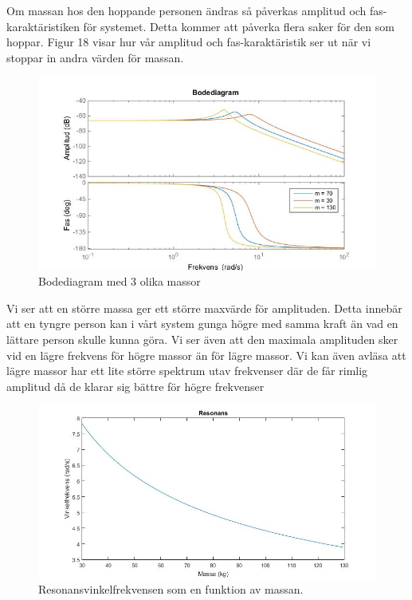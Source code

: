 \documentclass[10pt,a4paper]{article}
\begin{document}
Om massan hos den hoppande personen ändras så påverkas amplitud och fas-karaktäristiken för systemet. Detta kommer att påverka flera saker för den som hoppar. Figur 18 visar hur vår amplitud och fas-karaktäristik ser ut när vi stoppar in andra värden för massan. 

\begin{figure}[h]
\begin{center}
\includegraphics[scale=0.5]{Bode(massa)}
\caption{Bodediagram med 3 olika massor}
\end{center}
\end{figure}

Vi ser att en större massa ger ett större maxvärde för amplituden. Detta innebär att en tyngre person kan i vårt system gunga högre med samma kraft än vad en lättare person skulle kunna göra. Vi ser även att den maximala amplituden sker vid en lägre frekvens för högre massor än för lägre massor. Vi kan även avläsa att lägre massor har ett lite större spektrum utav frekvenser där de får rimlig amplitud då de klarar sig bättre för högre frekvenser

\newpage

\begin{figure}[h]
\begin{center}
\includegraphics[scale=0.4]{resonans}
\caption{Resonansvinkelfrekvensen som en funktion av massan.}
\end{center}
\end{figure}
\end{document}
